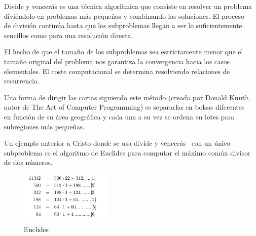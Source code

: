 
Divide y vencer\'as es una t\'ecnica algor\'itmica que consiste en resolver un problema divi\'endolo en problemas m\'as pequeños y combinando las soluciones. 
El proceso de divisi\'on contin\'ua hasta que los subproblemas llegan a ser lo suficientemente sencillos como para una resoluci\'on directa.

El hecho de que el tamaño de los subproblemas sea estrictamente menor que el tamaño original del problema nos garantiza la convergencia hacia los casos elementales.
El coste computacional se determina resolviendo relaciones de recurrencia.

Una forma de dirigir las cartas siguiendo este m\'etodo (creada por Donald Knuth, autor de The Art of Computer Programming) es separarlas en bolsas diferentes en funci\'on de su \'area geogr\'afica y cada una a su vez se ordena en lotes para subregiones más pequeñas.
 
Un ejemplo anterior a Cristo donde se usa divide y vencerás \ con un \'unico subproblema es el algoritmo de Euclides para computar el máximo com\'un divisor de dos n\'umeros.
 
\begin{figure}[htb] 
\centering
	\includegraphics[width=0.40\textwidth]{./Imagenes/euclides.jpg}
	\caption{Euclides} 
	\label{fig:euclides} 
\end{figure}